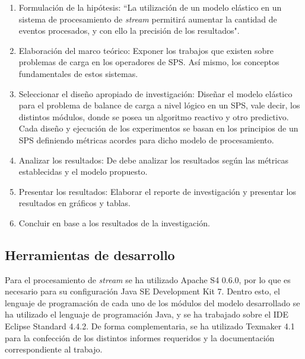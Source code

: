 \begin{enumerate}
	\item Formulaci\'on de la hip\'otesis: ``La utilizaci\'on de un modelo el\'astico en un sistema de procesamiento de \textit{stream} permitir\'a aumentar la cantidad de eventos procesados, y con ello la precisi\'on de los resultados".
	\item Elaboraci\'on del marco te\'orico: Exponer los trabajos que existen sobre problemas de carga en los operadores de SPS. As\'i mismo, los conceptos fundamentales de estos sistemas.
	\item Seleccionar el dise\~no apropiado de investigaci\'on: Dise\~nar el modelo el\'astico para el problema de balance de carga a nivel l\'ogico en un SPS, vale decir, los distintos m\'odulos, donde se posea un algoritmo reactivo y otro predictivo. Cada dise\~no y ejecuci\'on de los experimentos se basan en los principios de un SPS definiendo m\'etricas acordes para dicho modelo de procesamiento.
	\item Analizar los resultados: De debe analizar los resultados seg\'un las m\'etricas establecidas y el modelo propuesto.
	\item Presentar los resultados: Elaborar el reporte de investigaci\'on y presentar los resultados en gr\'aficos y tablas.
	\item Concluir en base a los resultados de la investigaci\'on.
\end{enumerate}

\subsection{Herramientas de desarrollo}
Para el procesamiento de \textit{stream} se ha utilizado Apache S4 0.6.0, por lo que es necesario para su configuraci\'on Java SE Development Kit 7. Dentro esto, el lenguaje de programaci\'on de cada uno de los m\'odulos del modelo desarrollado se ha utilizado el lenguaje de programaci\'on Java, y se ha trabajado sobre el IDE Eclipse Standard 4.4.2. De forma complementaria, se ha utilizado Texmaker 4.1 para la confecci\'on de los distintos informes requeridos y la documentaci\'on correspondiente al trabajo.

